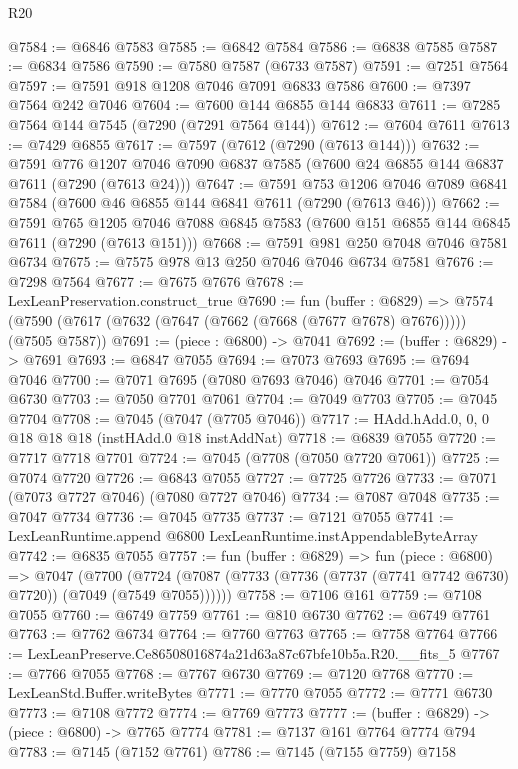 \begin{lexlean}{R20}
\begin{coremodule}
{@7584 := @6846 @7583
@7585 := @6842 @7584
@7586 := @6838 @7585
@7587 := @6834 @7586
@7590 := @7580 @7587 (@6733 @7587)
@7591 := @7251 @7564
@7597 := @7591 @918 @1208 @7046 @7091 @6833 @7586
@7600 := @7397 @7564 @242 @7046
@7604 := @7600 @144 @6855 @144 @6833
@7611 := @7285 @7564 @144 @7545 (@7290 (@7291 @7564 @144))
@7612 := @7604 @7611
@7613 := @7429 @6855
@7617 := @7597 (@7612 (@7290 (@7613 @144)))
@7632 := @7591
    @776
    @1207
    @7046
    @7090
    @6837
    @7585
    (@7600 @24 @6855 @144 @6837 @7611 (@7290 (@7613 @24)))
@7647 := @7591
    @753
    @1206
    @7046
    @7089
    @6841
    @7584
    (@7600 @46 @6855 @144 @6841 @7611 (@7290 (@7613 @46)))
@7662 := @7591
    @765
    @1205
    @7046
    @7088
    @6845
    @7583
    (@7600 @151 @6855 @144 @6845 @7611 (@7290 (@7613 @151)))
@7668 := @7591 @981 @250 @7048 @7046 @7581 @6734
@7675 := @7575 @978 @13 @250 @7046 @7046 @6734 @7581
@7676 := @7298 @7564
@7677 := @7675 @7676
@7678 := LexLeanPreservation.construct_true
@7690 := fun (buffer : @6829) =>
  @7574 (@7590 (@7617 (@7632 (@7647 (@7662 (@7668 (@7677 @7678) @7676))))) (@7505 @7587))
@7691 := (piece : @6800) -> @7041
@7692 := (buffer : @6829) -> @7691
@7693 := @6847 @7055
@7694 := @7073 @7693
@7695 := @7694 @7046
@7700 := @7071 @7695 (@7080 @7693 @7046) @7046
@7701 := @7054 @6730
@7703 := @7050 @7701 @7061
@7704 := @7049 @7703
@7705 := @7045 @7704
@7708 := @7045 (@7047 (@7705 @7046))
@7717 := HAdd.hAdd.{0, 0, 0} @18 @18 @18 (instHAdd.{0} @18 instAddNat)
@7718 := @6839 @7055
@7720 := @7717 @7718 @7701
@7724 := @7045 (@7708 (@7050 @7720 @7061))
@7725 := @7074 @7720
@7726 := @6843 @7055
@7727 := @7725 @7726
@7733 := @7071 (@7073 @7727 @7046) (@7080 @7727 @7046)
@7734 := @7087 @7048
@7735 := @7047 @7734
@7736 := @7045 @7735
@7737 := @7121 @7055
@7741 := LexLeanRuntime.append @6800 LexLeanRuntime.instAppendableByteArray
@7742 := @6835 @7055
@7757 := fun (buffer : @6829) =>
  fun (piece : @6800) =>
  @7047
    (@7700 (@7724 (@7087 (@7733 (@7736 (@7737 (@7741 @7742 @6730) @7720)) (@7049 (@7549 @7055))))))
@7758 := @7106 @161
@7759 := @7108 @7055
@7760 := @6749 @7759
@7761 := @810 @6730
@7762 := @6749 @7761
@7763 := @7762 @6734
@7764 := @7760 @7763
@7765 := @7758 @7764
@7766 := LexLeanPreserve.Ce86508016874a21d63a87c67bfe10b5a.R20.__fits_5
@7767 := @7766 @7055
@7768 := @7767 @6730
@7769 := @7120 @7768
@7770 := LexLeanStd.Buffer.writeBytes
@7771 := @7770 @7055
@7772 := @7771 @6730
@7773 := @7108 @7772
@7774 := @7769 @7773
@7777 := (buffer : @6829) -> (piece : @6800) -> @7765 @7774
@7781 := @7137 @161 @7764 @7774 @794
@7783 := @7145 (@7152 @7761)
@7786 := @7145 (@7155 @7759) @7158
}
\end{coremodule}
\end{lexlean}
